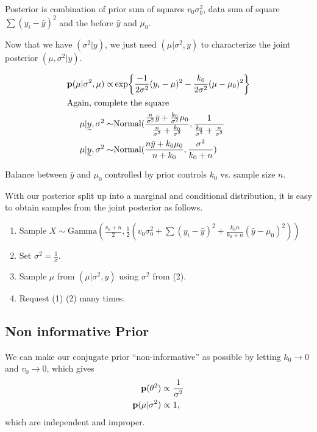 Posterior is combination of prior sum of squares $v_0\sigma_0^2$, data sum of square $\sum(y_i - \bar{y})^2$ and the before $\bar{y}$ and $\mu_0$.

Now that we have $(\sigma^2|y)$, we just need $(\mu|\sigma^2, y)$ to characterize the joint posterior $(\mu, \sigma^2|y)$.

\begin{align*}
    \p(\mu| \sigma^2, \mu) 
    \propto &
    \exp{\frac{-1}{2\sigma^2} (y_i - \mu)^2 - \frac{k_0}{2\sigma^2}(\mu - \mu_0)^2}  \\
    \intertext{Again, complete the square}
    \mu| \vec{y}, \sigma^2
    \sim &
    \text{Normal}(
    \frac{
    \frac{n}{\sigma^2} \bar{y} + \frac{k_0}{\sigma^2}\mu_0
    }{\frac{n}{\sigma^2} + \frac{k_0}{\sigma^2}}
    ,
    \frac{1}{\frac{k_0}{\sigma^2} + \frac{n}{\sigma^2}}\\
    \mu| \vec{y}, \sigma^2
    \sim &
    \text{Normal}(
    \frac{
    n \bar{y} + k_0\mu_0
    }{n + k_0}
    ,
    \frac{\sigma^2}{k_0 + n}
    )
\end{align*}

Balance between $\bar{y}$ and $\mu_0$ controlled by prior controls $k_0$ vs. sample size $n$.

With our posterior split up into a marginal and conditional distribution, it is easy to obtain samples from the joint posterior as follows.

\begin{enumerate}[(1)]
    \item Sample 
    $X \sim \text{Gamma}(\frac{v_0 + n}{2}, 
            \frac{1}{2} (v_0\sigma_0^2 + \sum(y_i - \bar{y})^2 + \frac{k_0 n}{k_0 + n}(\bar{y}-\mu_0)^2))$
    \item Set $\sigma^2 = \frac{1}{x}$.
    \item Sample $\mu$ from $(\mu|\sigma^2, y)$ using $\sigma^2$ from (2).
    \item Request (1) (2) many times.
\end{enumerate}

\subsection{Non informative Prior}
We can make our conjugate prior ``non-informative'' as possible by letting $k_0 \rightarrow 0$ and $v_0 \rightarrow 0$, which gives 
\begin{align*}
    {\mathbf p}(\theta^2) \propto& ~\frac{1}{\sigma^2}\\
    {\mathbf p}(\mu| \sigma^2) \propto& ~1,
\end{align*}
which are independent and improper.

